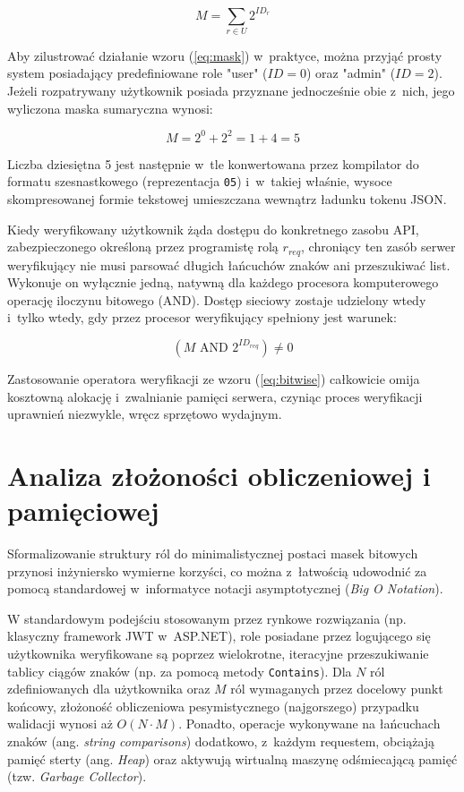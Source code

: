 \documentclass{SGGW-thesis}
\begin{document}
\begin{equation}
M = \sum_{r \in U} 2^{ID_r}
\label{eq:mask}
\end{equation}

Aby zilustrować działanie wzoru (\ref{eq:mask}) w~praktyce, można przyjąć prosty system posiadający predefiniowane role "user" ($ID=0$) oraz "admin" ($ID=2$). Jeżeli rozpatrywany użytkownik posiada przyznane jednocześnie obie z~nich, jego wyliczona maska sumaryczna wynosi:

\begin{equation}
M = 2^0 + 2^2 = 1 + 4 = 5
\label{eq:mask_example}
\end{equation}

Liczba dziesiętna 5 jest następnie w~tle konwertowana przez kompilator do formatu szesnastkowego (reprezentacja \texttt{05}) i~w~takiej właśnie, wysoce skompresowanej formie tekstowej umieszczana wewnątrz ładunku tokenu JSON.

Kiedy weryfikowany użytkownik żąda dostępu do konkretnego zasobu API, zabezpieczonego określoną przez programistę rolą $r_{req}$, chroniący ten zasób serwer weryfikujący nie musi parsować długich łańcuchów znaków ani przeszukiwać list. Wykonuje on wyłącznie jedną, natywną dla każdego procesora komputerowego operację iloczynu bitowego (AND). Dostęp sieciowy zostaje udzielony wtedy i~tylko wtedy, gdy przez procesor weryfikujący spełniony jest warunek:

\begin{equation}
(M \text{ AND } 2^{ID_{req}}) \neq 0
\label{eq:bitwise}
\end{equation}

Zastosowanie operatora weryfikacji ze wzoru (\ref{eq:bitwise}) całkowicie omija kosztowną alokację i~zwalnianie pamięci serwera, czyniąc proces weryfikacji uprawnień niezwykle, wręcz sprzętowo wydajnym.

\section{Analiza złożoności obliczeniowej i pamięciowej}

Sformalizowanie struktury ról do minimalistycznej postaci masek bitowych przynosi inżyniersko wymierne korzyści, co można z~łatwością udowodnić za pomocą standardowej w~informatyce notacji asymptotycznej (\textit{Big O Notation}). 

W standardowym podejściu stosowanym przez rynkowe rozwiązania (np. klasyczny framework JWT w~ASP.NET), role posiadane przez logującego się użytkownika weryfikowane są poprzez wielokrotne, iteracyjne przeszukiwanie tablicy ciągów znaków (np. za pomocą metody \texttt{Contains}). Dla $N$ ról zdefiniowanych dla użytkownika oraz $M$ ról wymaganych przez docelowy punkt końcowy, złożoność obliczeniowa pesymistycznego (najgorszego) przypadku walidacji wynosi aż $O(N \cdot M)$. Ponadto, operacje wykonywane na łańcuchach znaków (ang. \textit{string comparisons}) dodatkowo, z~każdym requestem, obciążają pamięć sterty (ang. \textit{Heap}) oraz aktywują wirtualną maszynę odśmiecającą pamięć (tzw. \textit{Garbage Collector}).
\end{document}
